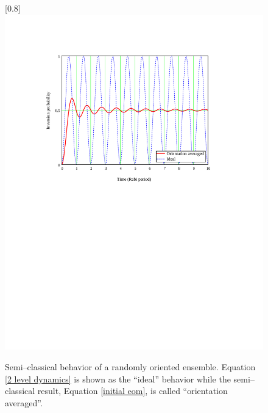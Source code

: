 \begin{figure}
\scalebox{0.8}[0.8]{
\includegraphics[bb=40 400 489 652]
{dynamics/dynamics.pdf}
}
\caption[Semi-classical behavior of a randomly oriented ensemble]{Semi--classical behavior of a randomly oriented ensemble. Equation \ref{2 level dynamics} is shown as the ``ideal'' behavior while the semi--classical result, Equation \ref{initial eom}, is called ``orientation averaged''.}
\label{dynamics}
\end{figure}
